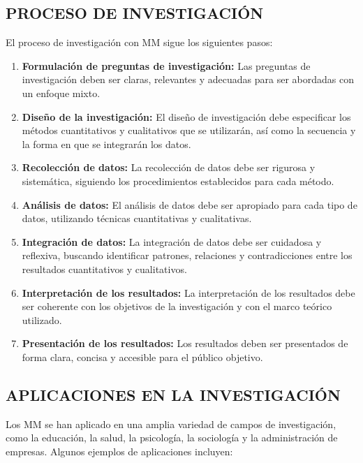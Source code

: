 \subsection{PROCESO DE INVESTIGACIÓN}

El proceso de investigación con MM sigue los siguientes pasos:

\begin{enumerate}
    \item \textbf{Formulación de preguntas de investigación:} Las preguntas de investigación deben ser claras, relevantes y adecuadas para ser abordadas con un enfoque mixto.
    \item \textbf{Diseño de la investigación:} El diseño de investigación debe especificar los métodos cuantitativos y cualitativos que se utilizarán, así como la secuencia y la forma en que se integrarán los datos.
    \item \textbf{Recolección de datos:} La recolección de datos debe ser rigurosa y sistemática, siguiendo los procedimientos establecidos para cada método.
    \item \textbf{Análisis de datos:} El análisis de datos debe ser apropiado para cada tipo de datos, utilizando técnicas cuantitativas y cualitativas.
    \item \textbf{Integración de datos:} La integración de datos debe ser cuidadosa y reflexiva, buscando identificar patrones, relaciones y contradicciones entre los resultados cuantitativos y cualitativos.
    \item \textbf{Interpretación de los resultados:} La interpretación de los resultados debe ser coherente con los objetivos de la investigación y con el marco teórico utilizado.
    \item \textbf{Presentación de los resultados:} Los resultados deben ser presentados de forma clara, concisa y accesible para el público objetivo.
\end{enumerate}

\subsection{APLICACIONES EN LA INVESTIGACIÓN}

Los MM se han aplicado en una amplia variedad de campos de investigación, como la educación, la salud, la psicología, la sociología y la administración de empresas. Algunos ejemplos de aplicaciones incluyen:

